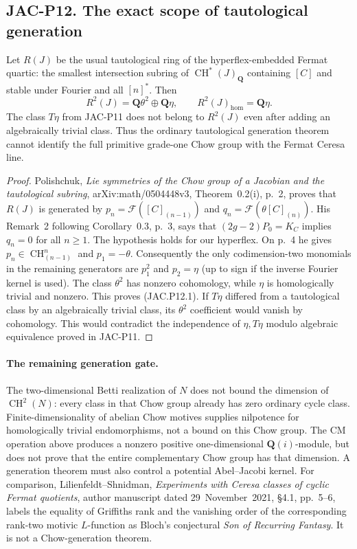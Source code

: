 \subsection*{JAC-P12. The exact scope of tautological generation}

\begin{proposition}[JAC-P12]\label{jac:P12}
Let $R(J)$ be the usual tautological ring of the hyperflex-embedded
Fermat quartic: the smallest intersection subring of
$\operatorname{CH}^*(J)_{\mathbf Q}$ containing $[C]$ and stable
under Fourier and all $[n]^*$. Then
\[
 R^2(J)=\mathbf Q\theta^2\oplus\mathbf Q\eta,\qquad
 R^2(J)_{\mathrm{hom}}=\mathbf Q\eta.                  \tag{JAC.P12.1}
\]
The class $T\eta$ from JAC-P11 does not belong to $R^2(J)$ even
after adding an algebraically trivial class. Thus the ordinary
tautological generation theorem cannot identify the full primitive
grade-one Chow group with the Fermat Ceresa line.
\end{proposition}

\begin{proof}
Polishchuk, \emph{Lie symmetries of the Chow group of a Jacobian
and the tautological subring}, arXiv:math/0504448v3,
Theorem~0.2(i), p.~2, proves that $R(J)$ is generated by
$p_n=\mathcal F([C]_{(n-1)})$ and
$q_n=\mathcal F(\theta[C]_{(n)})$.
His Remark~2 following Corollary~0.3, p.~3, says that
$(2g-2)P_0=K_C$ implies $q_n=0$ for all $n\ge1$.
The hypothesis holds for our hyperflex. On p.~4 he gives
$p_n\in\operatorname{CH}^n_{(n-1)}$ and $p_1=-\theta$.
Consequently the only codimension-two monomials in the remaining
generators are $p_1^2$ and $p_2=\eta$ (up to sign if the inverse
Fourier kernel is used). The class $\theta^2$ has nonzero
cohomology, while $\eta$ is homologically trivial and nonzero.
This proves (JAC.P12.1).
If $T\eta$ differed from a tautological class by an algebraically
trivial class, its $\theta^2$ coefficient would vanish by cohomology.
This would contradict the independence of $\eta,T\eta$ modulo
algebraic equivalence proved in JAC-P11.
\end{proof}

\paragraph{The remaining generation gate.}
The two-dimensional Betti realization of $N$ does not bound the
dimension of $\operatorname{CH}^2(N)$: every class in that Chow
group already has zero ordinary cycle class.
Finite-dimensionality of abelian Chow motives supplies nilpotence
for homologically trivial endomorphisms, not a bound on this Chow
group. The CM operation above produces a nonzero positive
one-dimensional $\mathbf Q(i)$-module, but does not prove that
the entire complementary Chow group has that dimension.
A generation theorem must also control a potential Abel--Jacobi
kernel. For comparison, Lilienfeldt--Shnidman,
\emph{Experiments with Ceresa classes of cyclic Fermat quotients},
author manuscript dated 29~November~2021, \S4.1, pp.~5--6,
labels the equality of Griffiths rank and the vanishing order of
the corresponding rank-two motivic $L$-function as Bloch's
conjectural \emph{Son of Recurring Fantasy}.
It is not a Chow-generation theorem.

